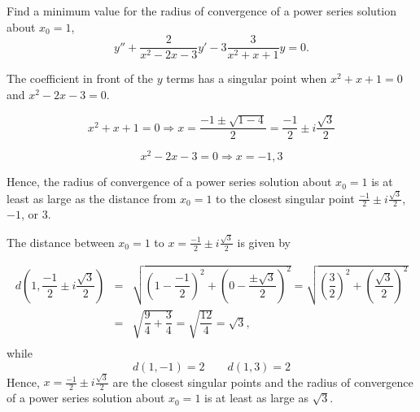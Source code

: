 \documentclass[11pt]{article}
\begin{document}
\begin{problem}
Find a minimum value for the radius of convergence of a power series solution about $x_{0} =1$,
\begin{equation*}
y'' + \frac{2}{x^{2}-2x-3}y'-3\frac{3}{x^2+x+1}y =0.
\end{equation*}
\end{problem}
\begin{solution}
The coefficient in front of the $y$ terms has a singular point when $x^2+x+1=0$ and $x^{2}-2x-3=0$.

\begin{equation*}
x^2+x+1 = 0 \Rightarrow x = \dfrac{-1 \pm \sqrt{1-4}}{2} = \dfrac{-1}{2} \pm i \dfrac{\sqrt{3}}{2} 
\end{equation*}

\begin{equation*}
x^2-2x-3 = 0 \Rightarrow x = -1,3
\end{equation*}

Hence, the radius of convergence of a power series solution about $x_{0} =1$ is at least as large as the distance from $x_{0} =1$ to the closest singular point $ \tfrac{-1}{2} \pm i \tfrac{\sqrt{3}}{2} $, $-1$, or $3$.

The distance between $x_{0} =1$ to $x=\tfrac{-1}{2} \pm i \tfrac{\sqrt{3}}{2}$ is given by

\begin{eqnarray*}
d\left(1,\dfrac{-1}{2} \pm i \dfrac{\sqrt{3}}{2}\right)   & = & \sqrt{ \left(1-\dfrac{-1}{2}\right)^2 + \left(0-\dfrac{\pm\sqrt{3}}{2}\right)^2 } = \sqrt{ \left(\dfrac{3}{2}\right)^2 + \left(\dfrac{\sqrt{3}}{2}\right)^2 }\\
& = &  \sqrt{ \dfrac{9}{4} + \dfrac{3}{4} } =  \sqrt{\dfrac{12}{4} } =  \sqrt{3 }, \\
\end{eqnarray*}
while
\[d(1,-1)=2\qquad d(1,3)=2\]
Hence, $x=\tfrac{-1}{2} \pm i \tfrac{\sqrt{3}}{2}$ are the closest singular points and the radius of convergence of a power series solution about $x_{0} =1$ is at least as large as $\sqrt{3}$.
\end{solution}
\end{document}
